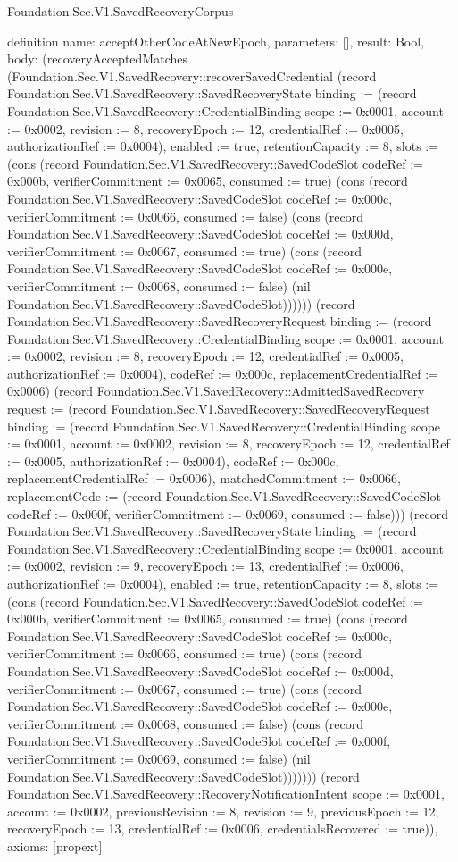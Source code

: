 \begin{lexlean}{Foundation.Sec.V1.SavedRecoveryCorpus}
\begin{semanticmodule}
definition{
  name: acceptOtherCodeAtNewEpoch,
  parameters: [],
  result: Bool,
  body: (recoveryAcceptedMatches (Foundation.Sec.V1.SavedRecovery::recoverSavedCredential (record Foundation.Sec.V1.SavedRecovery::SavedRecoveryState {binding := (record Foundation.Sec.V1.SavedRecovery::CredentialBinding {scope := 0x0001, account := 0x0002, revision := 8, recoveryEpoch := 12, credentialRef := 0x0005, authorizationRef := 0x0004}), enabled := true, retentionCapacity := 8, slots := (cons (record Foundation.Sec.V1.SavedRecovery::SavedCodeSlot {codeRef := 0x000b, verifierCommitment := 0x0065, consumed := true}) (cons (record Foundation.Sec.V1.SavedRecovery::SavedCodeSlot {codeRef := 0x000c, verifierCommitment := 0x0066, consumed := false}) (cons (record Foundation.Sec.V1.SavedRecovery::SavedCodeSlot {codeRef := 0x000d, verifierCommitment := 0x0067, consumed := true}) (cons (record Foundation.Sec.V1.SavedRecovery::SavedCodeSlot {codeRef := 0x000e, verifierCommitment := 0x0068, consumed := false}) (nil Foundation.Sec.V1.SavedRecovery::SavedCodeSlot)))))}) (record Foundation.Sec.V1.SavedRecovery::SavedRecoveryRequest {binding := (record Foundation.Sec.V1.SavedRecovery::CredentialBinding {scope := 0x0001, account := 0x0002, revision := 8, recoveryEpoch := 12, credentialRef := 0x0005, authorizationRef := 0x0004}), codeRef := 0x000c, replacementCredentialRef := 0x0006}) (record Foundation.Sec.V1.SavedRecovery::AdmittedSavedRecovery {request := (record Foundation.Sec.V1.SavedRecovery::SavedRecoveryRequest {binding := (record Foundation.Sec.V1.SavedRecovery::CredentialBinding {scope := 0x0001, account := 0x0002, revision := 8, recoveryEpoch := 12, credentialRef := 0x0005, authorizationRef := 0x0004}), codeRef := 0x000c, replacementCredentialRef := 0x0006}), matchedCommitment := 0x0066, replacementCode := (record Foundation.Sec.V1.SavedRecovery::SavedCodeSlot {codeRef := 0x000f, verifierCommitment := 0x0069, consumed := false})})) (record Foundation.Sec.V1.SavedRecovery::SavedRecoveryState {binding := (record Foundation.Sec.V1.SavedRecovery::CredentialBinding {scope := 0x0001, account := 0x0002, revision := 9, recoveryEpoch := 13, credentialRef := 0x0006, authorizationRef := 0x0004}), enabled := true, retentionCapacity := 8, slots := (cons (record Foundation.Sec.V1.SavedRecovery::SavedCodeSlot {codeRef := 0x000b, verifierCommitment := 0x0065, consumed := true}) (cons (record Foundation.Sec.V1.SavedRecovery::SavedCodeSlot {codeRef := 0x000c, verifierCommitment := 0x0066, consumed := true}) (cons (record Foundation.Sec.V1.SavedRecovery::SavedCodeSlot {codeRef := 0x000d, verifierCommitment := 0x0067, consumed := true}) (cons (record Foundation.Sec.V1.SavedRecovery::SavedCodeSlot {codeRef := 0x000e, verifierCommitment := 0x0068, consumed := false}) (cons (record Foundation.Sec.V1.SavedRecovery::SavedCodeSlot {codeRef := 0x000f, verifierCommitment := 0x0069, consumed := false}) (nil Foundation.Sec.V1.SavedRecovery::SavedCodeSlot))))))}) (record Foundation.Sec.V1.SavedRecovery::RecoveryNotificationIntent {scope := 0x0001, account := 0x0002, previousRevision := 8, revision := 9, previousEpoch := 12, recoveryEpoch := 13, credentialRef := 0x0006, credentialsRecovered := true})),
  axioms: [propext]
}


\end{semanticmodule}
\end{lexlean}
